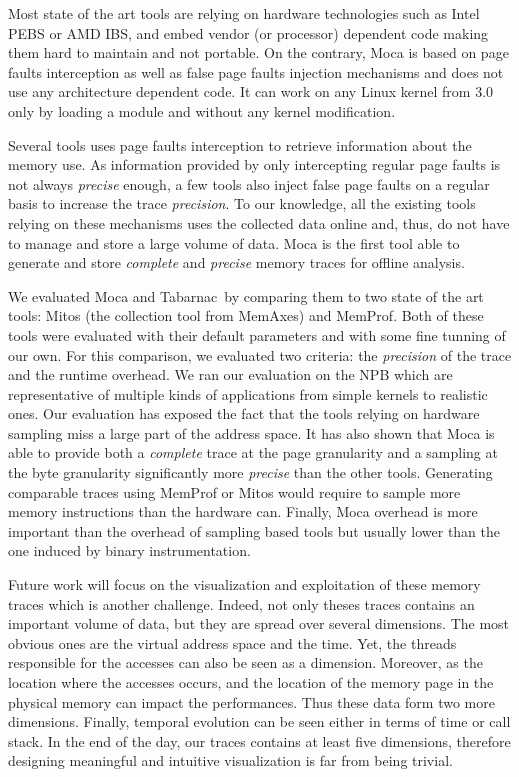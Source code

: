 Most state of the art tools are relying on hardware technologies such as \gls{Intel} \gls{PEBS} or \gls{AMD} \gls{IBS}, and embed vendor (or processor) dependent code making them hard to maintain and not portable.
On the contrary, \gls{Moca} is based on page faults interception as well as false page faults injection mechanisms and does not use any architecture dependent code.
It can work on any \gls{Linux} kernel from $3.0$ only by loading a module and without any kernel modification.

Several tools uses page faults interception to retrieve information about the memory use.
As information provided by only intercepting regular page faults is not always \emph{precise} enough, a few tools also inject false page faults on a regular basis to increase the trace \emph{precision}.
To our knowledge, all the existing tools relying on these mechanisms uses the collected data online and, thus, do not have to manage and store a large volume of data.
\gls{Moca} is the first tool able to generate and store \emph{complete} and \emph{precise} memory traces for offline analysis.

We evaluated \gls{Moca} and \gls{Tabarnac} by comparing them to two state of the art tools: \gls{Mitos} (the collection tool from \gls{MemAxes}) and \gls{MemProf}.
Both of these tools were evaluated with their default parameters and with some fine tunning of our own.
For this comparison, we evaluated two criteria: the \emph{precision} of the trace and the runtime overhead.
We ran our evaluation on the \gls{NPB} which are representative of multiple kinds of applications from simple kernels to realistic ones.
Our evaluation has exposed the fact that the tools relying on hardware sampling miss a large part of the address space.
It has also shown that \gls{Moca} is able to provide both a \emph{complete} trace at the page granularity and a sampling at the byte granularity significantly more \emph{precise} than the other tools.
Generating comparable traces using \gls{MemProf} or \gls{Mitos} would require to sample more memory instructions than the hardware can.
Finally, \gls{Moca} overhead is more important than the overhead of sampling based tools but usually lower than the one induced by binary instrumentation.

Future work will focus on the visualization and exploitation of these memory traces which is another challenge.
Indeed, not only theses traces contains an important volume of data, but they are spread over several dimensions.
The most obvious ones are the virtual address space and the time.
Yet, the threads responsible for the accesses can also be seen as a dimension.
Moreover, as the location where the accesses occurs, and the location of the memory page in the physical memory can impact the performances.
Thus these data form two more dimensions.
Finally, temporal evolution can be seen either in terms of time or call stack.
In the end of the day, our traces contains at least five dimensions, therefore designing meaningful and intuitive visualization is far from being trivial.

